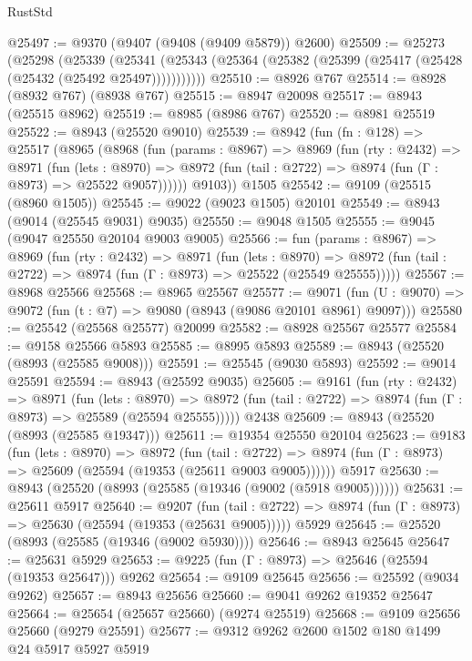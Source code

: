 \begin{lexlean}{RustStd}
\begin{coremodule}
{\begin{coremodule}
{{{{{{{{{{{{{{{{{{{{{{{{{{{{{{{{{{{{{{{@25497 := @9370 (@9407 (@9408 (@9409 @5879)) @2600)
@25509 := @25273
    (@25298
      (@25339
        (@25341 (@25343 (@25364 (@25382 (@25399 (@25417 (@25428 (@25432 (@25492 @25497)))))))))))
@25510 := @8926 @767
@25514 := @8928 (@8932 @767) (@8938 @767)
@25515 := @8947 @20098
@25517 := @8943 (@25515 @8962)
@25519 := @8985 (@8986 @767)
@25520 := @8981 @25519
@25522 := @8943 (@25520 @9010)
@25539 := @8942
    (fun (fn : @128) =>
    @25517
      (@8965
        (@8968
          (fun (params : @8967) =>
          @8969
            (fun (rty : @2432) =>
            @8971
              (fun (lets : @8970) =>
              @8972 (fun (tail : @2722) => @8974 (fun (Γ : @8973) => @25522 @9057))))))
        @9103))
    @1505
@25542 := @9109 (@25515 (@8960 @1505))
@25545 := @9022 (@9023 @1505) @20101
@25549 := @8943 (@9014 (@25545 @9031) @9035)
@25550 := @9048 @1505
@25555 := @9045 (@9047 @25550 @20104 @9003 @9005)
@25566 := fun (params : @8967) =>
  @8969
    (fun (rty : @2432) =>
    @8971
      (fun (lets : @8970) =>
      @8972 (fun (tail : @2722) => @8974 (fun (Γ : @8973) => @25522 (@25549 @25555)))))
@25567 := @8968 @25566
@25568 := @8965 @25567
@25577 := @9071
    (fun (U : @9070) => @9072 (fun (t : @7) => @9080 (@8943 (@9086 @20101 @8961) @9097)))
@25580 := @25542 (@25568 @25577) @20099
@25582 := @8928 @25567 @25577
@25584 := @9158 @25566 @5893
@25585 := @8995 @5893
@25589 := @8943 (@25520 (@8993 (@25585 @9008)))
@25591 := @25545 (@9030 @5893)
@25592 := @9014 @25591
@25594 := @8943 (@25592 @9035)
@25605 := @9161
    (fun (rty : @2432) =>
    @8971
      (fun (lets : @8970) =>
      @8972 (fun (tail : @2722) => @8974 (fun (Γ : @8973) => @25589 (@25594 @25555)))))
    @2438
@25609 := @8943 (@25520 (@8993 (@25585 @19347)))
@25611 := @19354 @25550 @20104
@25623 := @9183
    (fun (lets : @8970) =>
    @8972
      (fun (tail : @2722) =>
      @8974 (fun (Γ : @8973) => @25609 (@25594 (@19353 (@25611 @9003 @9005))))))
    @5917
@25630 := @8943 (@25520 (@8993 (@25585 (@19346 (@9002 (@5918 @9005))))))
@25631 := @25611 @5917
@25640 := @9207
    (fun (tail : @2722) => @8974 (fun (Γ : @8973) => @25630 (@25594 (@19353 (@25631 @9005)))))
    @5929
@25645 := @25520 (@8993 (@25585 (@19346 (@9002 @5930))))
@25646 := @8943 @25645
@25647 := @25631 @5929
@25653 := @9225 (fun (Γ : @8973) => @25646 (@25594 (@19353 @25647))) @9262
@25654 := @9109 @25645
@25656 := @25592 (@9034 @9262)
@25657 := @8943 @25656
@25660 := @9041 @9262 @19352 @25647
@25664 := @25654 (@25657 @25660) (@9274 @25519)
@25668 := @9109 @25656 @25660 (@9279 @25591)
@25677 := @9312 @9262 @2600 @1502 @180 @1499 @24 @5917 @5927 @5919
}}}}}}}}}}}}}}}}}}}}}}}}}}}}}}}}}}}}}}}
\end{coremodule}}
\end{coremodule}
\end{lexlean}
